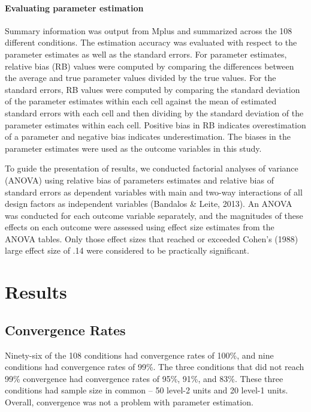 \documentclass[man, noextraspace, floatsintext, 12pt]{apa7}
\begin{document}
\paragraph*{Evaluating parameter estimation}
Summary information was output from Mplus and summarized across the 108 different conditions. The estimation accuracy was evaluated with respect to the parameter estimates as well as the standard errors. For parameter estimates, relative bias (RB) values were computed by comparing the differences between the average and true parameter values divided by the true values. For the standard errors, RB values were computed by comparing the standard deviation of the parameter estimates within each cell against the mean of estimated standard errors with each cell and then dividing by the standard deviation of the parameter estimates within each cell. Positive bias in RB indicates overestimation of a parameter and negative bias indicates underestimation. The biases in the parameter estimates were used as the outcome variables in this study.  

To guide the presentation of results, we conducted factorial analyses of variance (ANOVA) using relative bias of parameters estimates and relative bias of standard errors as dependent variables with main and two-way interactions of all design factors as independent variables (Bandalos \& Leite, 2013). An ANOVA was conducted for each outcome variable separately, and the magnitudes of these effects on each outcome were assessed using effect size estimates from the ANOVA tables.  Only those effect sizes that reached or exceeded Cohen's (1988) large effect size of .14 were considered to be practically significant.


\section*{Results}
\subsection*{Convergence Rates}
Ninety-six of the 108 conditions had convergence rates of 100\%, and nine conditions had convergence rates of 99\%. The three conditions that did not reach 99\% convergence had convergence rates of 95\%, 91\%, and 83\%. These three conditions had sample size in common -- 50 level-2 units and 20 level-1 units. Overall, convergence was not a problem with parameter estimation.
\end{document}
